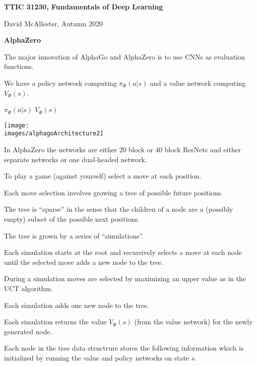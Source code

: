 




{\Huge

  \centerline{\bf TTIC 31230, Fundamentals of Deep Learning}
  \bigskip
  \centerline{David McAllester, Autumn 2020}

  \vfill
  \centerline{\bf AlphaZero}
  \vfill
  \vfill



The major innovation of AlphaGo and AlphaZero is to use CNNs as evaluation functions.

\vfill
We have a policy network computing $\pi_\Phi(a|s)$ and a value network computing $V_\Phi(s)$.


\centerline{$\pi_\Phi(a|s)$ \hspace{.5in} $V_\Phi(s)$}
\centerline{\texttt{[image: \\images/alphagoArchitecture2]}}

\vfill
In AlphaZero the networks are either 20 block or 40 block ResNets and either separate networks or one dual-headed network.


To play a game (against yourself) select a move at each position.

\vfill
Each move selection involves growing a tree of possible future positions.

\vfill
The tree is ``sparse'' in the sense that the children of a node are a (possibly empty) subset of the possible next positions.

\vfill
The tree is grown by a series of ``simulations''.

\vfill
Each simulation starts at the root and recursively selects a move at each node until the selected move adds a new node to the tree.


During a simulation moves are selected by maximizing an upper value as in the UCT algorithm.

\vfill
Each simulation adds one new node to the tree.

\vfill
Each simulation returns the value $V_\Phi(s)$ (from the value network) for the newly generated node.


\vfill
Each node in the tree data structrure stores the following information which is initialized
by running the value and policy networks on state $s$.

}
